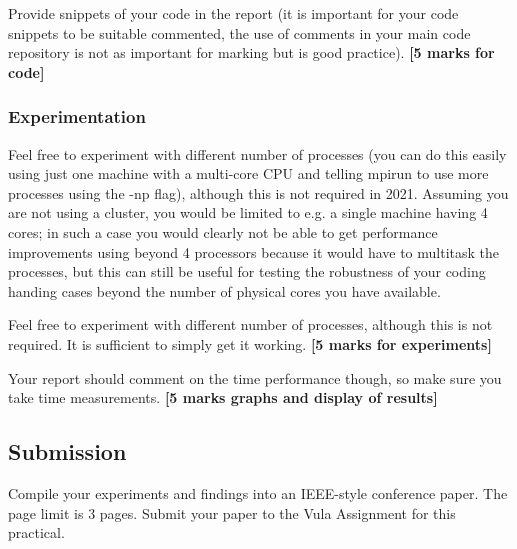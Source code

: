 Provide snippets of your code in the report (it is important for your code snippets to be suitable commented, the use of comments in your main code repository is not as important for marking but is good practice). \textbf{[5 marks for code]}

\subsubsection{Experimentation}

Feel free to experiment with diﬀerent number of processes (you can do this easily using just one machine with a multi-core CPU and telling mpirun to use more processes using the -np ﬂag), although this is not required in 2021. Assuming you are not using a cluster, you would be limited to e.g. a single machine having 4 cores; in such a case you would clearly not be able to get performance improvements using beyond 4 processors because it would have to multitask the processes, but this can still be useful for testing the robustness of your coding handing cases beyond the number of physical cores you have available.

Feel free to experiment with different number of processes, although this is not required. It is sufficient to simply get it working. \textbf{[5 marks for experiments]}

Your report should comment on the time performance though, so make sure you take time measurements. \textbf{[5 marks graphs and display of results]}

\subsection{Submission}

Compile your experiments and findings into an IEEE-style conference paper. 
The page limit is 3 pages. Submit your paper to the Vula Assignment for this practical.

